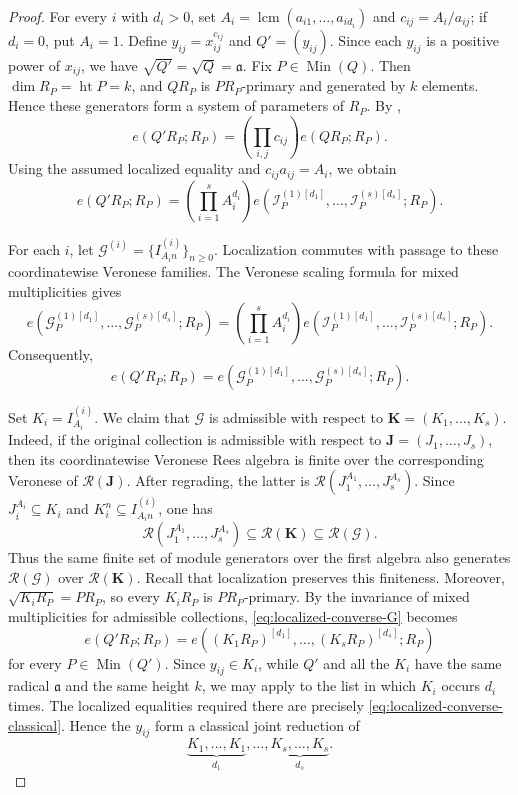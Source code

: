 \documentclass[reqno,12pt]{amsart}
\theoremstyle{plain}
\theoremstyle{definition}
\theoremstyle{remark}
\numberwithin{equation}{section}
\begin{document}
\begin{proof}
For every $i$ with $d_i>0$, set
$A_i=\operatorname{lcm}(a_{i1},\ldots,a_{id_i})$ and
$c_{ij}=A_i/a_{ij}$; if $d_i=0$, put $A_i=1$. Define
$y_{ij}=x_{ij}^{c_{ij}}$ and $Q'=(y_{ij})$. Since each $y_{ij}$ is a
positive power of $x_{ij}$, we have
$\sqrt{Q'}=\sqrt Q=\mathfrak a$. Fix $P\in\operatorname{Min}(Q)$. Then
$\dim R_P=\operatorname{ht}P=k$, and $QR_P$ is $PR_P$-primary and
generated by $k$ elements. Hence these generators form a system of
parameters of $R_P$. By
\cite[Proposition~11.2.9(2)]{SwansonHuneke},
\[
e(Q'R_P;R_P)
=
\left(\prod_{i,j}c_{ij}\right)e(QR_P;R_P).
\]
Using the assumed localized equality and
$c_{ij}a_{ij}=A_i$, we obtain
\[
e(Q'R_P;R_P)
=
\left(\prod_{i=1}^{s}A_i^{d_i}\right)
e\!\left(
\mathcal I_P^{(1)[d_1]},\ldots,
\mathcal I_P^{(s)[d_s]};R_P
\right).
\]

For each $i$, let
$\mathcal G^{(i)}=\{I_{A_i n}^{(i)}\}_{n\geq0}$.
Localization commutes with passage to these coordinatewise Veronese
families. The Veronese scaling formula for mixed multiplicities gives
\[
e\!\left(
\mathcal G_P^{(1)[d_1]},\ldots,
\mathcal G_P^{(s)[d_s]};R_P
\right)
=
\left(\prod_{i=1}^{s}A_i^{d_i}\right)
e\!\left(
\mathcal I_P^{(1)[d_1]},\ldots,
\mathcal I_P^{(s)[d_s]};R_P
\right).
\]
Consequently,
\begin{equation}
\label{eq:localized-converse-G}
e(Q'R_P;R_P)
=
e\!\left(
\mathcal G_P^{(1)[d_1]},\ldots,
\mathcal G_P^{(s)[d_s]};R_P
\right).
\end{equation}

Set $K_i=I_{A_i}^{(i)}$. We claim that
$\boldsymbol{\mathcal G}$ is admissible with respect to
$\mathbf K=(K_1,\ldots,K_s)$. Indeed, if the original collection is
admissible with respect to $\mathbf J=(J_1,\ldots,J_s)$, then its
coordinatewise Veronese Rees algebra is finite over the corresponding
Veronese of $\mathcal R(\mathbf J)$. After regrading, the latter is
$\mathcal R(J_1^{A_1},\ldots,J_s^{A_s})$. Since
$J_i^{A_i}\subseteq K_i$ and
$K_i^n\subseteq I_{A_i n}^{(i)}$, one has
\[
\mathcal R(J_1^{A_1},\ldots,J_s^{A_s})
\subseteq
\mathcal R(\mathbf K)
\subseteq
\mathcal R(\boldsymbol{\mathcal G}).
\]
Thus the same finite set of module generators over the first algebra
also generates $\mathcal R(\boldsymbol{\mathcal G})$ over
$\mathcal R(\mathbf K)$. Recall that localization preserves this finiteness. Moreover,
$\sqrt{K_iR_P}=PR_P$, so every $K_iR_P$ is $PR_P$-primary.
By the invariance of mixed multiplicities for admissible collections,
\eqref{eq:localized-converse-G} becomes
\begin{equation}
\label{eq:localized-converse-classical}
e(Q'R_P;R_P)
=
e\!\left(
(K_1R_P)^{[d_1]},\ldots,
(K_sR_P)^{[d_s]};R_P
\right)
\end{equation}
for every $P\in\operatorname{Min}(Q')$. Since $y_{ij}\in K_i$, while $Q'$ and all the $K_i$ have the same
radical $\mathfrak a$ and the same height $k$, we may apply
\cite[Theorem~17.6.1]{SwansonHuneke} to the list in which $K_i$ occurs
$d_i$ times. The localized equalities required there are precisely
\eqref{eq:localized-converse-classical}. Hence the $y_{ij}$ form a
classical joint reduction of
\[
\underbrace{K_1,\ldots,K_1}_{d_1},
\ldots,
\underbrace{K_s,\ldots,K_s}_{d_s}.
\]


\end{proof}
\end{document}
